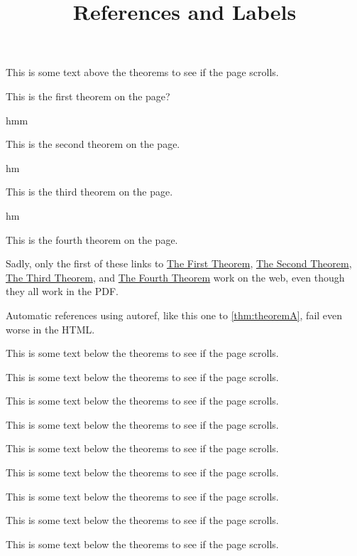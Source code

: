 \documentclass{ximera}
\begin{document}
\title{References and Labels}

This is some text above the theorems to see if the page scrolls.

\begin{theorem}
\label{thm:theoremA} This is the first theorem on the page?
\end{theorem}

hmm

\begin{theorem}
\label{thm:theoremB} This is the second theorem on the page.
\end{theorem}

hm

\begin{theorem}
\label{thm:theoremC} This is the third theorem on the page.
\end{theorem}

hm


\begin{theorem}
\label{thm:theoremD} This is the fourth theorem on the page.
\end{theorem}

Sadly, only the first of these links to \hyperref[thm:theoremA]{The First Theorem}, \hyperref[thm:theoremB]{The Second Theorem}, \hyperref[thm:theoremC]{The Third Theorem}, and \hyperref[thm:theoremD]{The Fourth Theorem} work on the web, even though they all work in the PDF.

Automatic references using autoref, like this one to \autoref{thm:theoremA}, fail even worse in the HTML.

This is some text below the theorems to see if the page scrolls.

This is some text below the theorems to see if the page scrolls.

This is some text below the theorems to see if the page scrolls.

This is some text below the theorems to see if the page scrolls.

This is some text below the theorems to see if the page scrolls.

This is some text below the theorems to see if the page scrolls.

This is some text below the theorems to see if the page scrolls.

This is some text below the theorems to see if the page scrolls.

This is some text below the theorems to see if the page scrolls.
\end{document}
